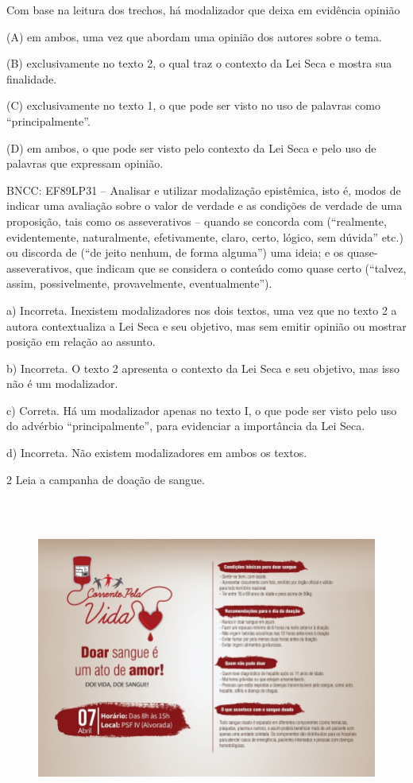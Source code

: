 \begin{itemize}
\begin{itemize}
Com base na leitura dos trechos, há modalizador que deixa em evidência
opinião

(A) em ambos, uma vez que abordam uma opinião dos autores sobre o tema.

(B) exclusivamente no texto 2, o qual traz o contexto da Lei Seca e
mostra sua finalidade.

(C) exclusivamente no texto 1, o que pode ser visto no uso de palavras
como ``principalmente''.

(D) em ambos, o que pode ser visto pelo contexto da Lei Seca e pelo uso
de palavras que expressam opinião.

BNCC: EF89LP31 -- Analisar e utilizar modalização epistêmica, isto é,
modos de indicar uma avaliação sobre o valor de verdade e as condições
de verdade de uma proposição, tais como os asseverativos -- quando se
concorda com (``realmente, evidentemente, naturalmente, efetivamente,
claro, certo, lógico, sem dúvida'' etc.) ou discorda de (``de jeito
nenhum, de forma alguma'') uma ideia; e os quase-asseverativos, que
indicam que se considera o conteúdo como quase certo (``talvez, assim,
possivelmente, provavelmente, eventualmente'').

a) Incorreta. Inexistem modalizadores nos dois textos, uma vez que no
texto 2 a autora contextualiza a Lei Seca e seu objetivo, mas sem emitir
opinião ou mostrar posição em relação ao assunto.

b) Incorreta. O texto 2 apresenta o contexto da Lei Seca e seu objetivo,
mas isso não é um modalizador.

c) Correta. Há um modalizador apenas no texto I, o que pode ser visto
pelo uso do advérbio ``principalmente'', para evidenciar a importância
da Lei Seca.

d) Incorreta. Não existem modalizadores em ambos os textos.

\num{2} Leia a campanha de doação de sangue.

\begin{figure}
\centering
\includegraphics[width=5.90556in,height=4.16829in]{./_SAEB_9_POR/media/image22.png}
\caption{}
\end{figure}


\end{itemize}
\end{itemize}
